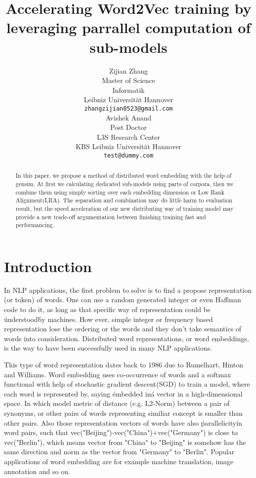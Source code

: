 \documentclass[11pt]{article}
\title{Accelerating Word2Vec training by leveraging parrallel computation of sub-models}
\author{Zijian Zhang \\
	Master of Science\\
	Informatik\\
	Leibniz Universit{\"a}t Hannover\\
	{\tt zhangzijian0523@gmail.com}\\ \And
	Avishek Anand\\
	Post Doctor\\
	L3S Research Center\\
	KBS Leibniz Universit{\"a}t Hannover\\
	{\tt test@dummy.com}\\
  }
\date{}
\begin{document}
\maketitle

\begin{abstract}

    In this paper, we propose a method of distributed word embedding with the help of gensim. At first we calculating dedicated sub-models using parts of corpora, then we combine them using simply sorting over each embedding dimension or Low Rank Alignment(LRA). The separation and combination may do little harm to evaluation result, but the speed acceleration of our new distributing way of training model may provide a new trade-off argumentation between finishing training fast and performancing.
 
\end{abstract}


\section{Introduction}
In NLP applications, the first problem to solve is to find a propose representation (or token) of words\cite{schutze2008introduction}. One can use a random generated integer or even Haffman code\cite{elcompression} to do it, as long as that specific way of representation could be \'understood\' by machines. How ever, simple integer or frequency based representation lose the ordering or the words and they don't take semantics of words into consideration\cite{le2014distributed}. Distributed word representations, or word embeddings, is the way to have been successfully used in many NLP applications. 

This type of word representation dates back to 1986 due to Rumelhart, Hinton and Williams\cite{williams1986learning}. Word embedding uses co-occurrence of words and a softmax functional with help of stochastic gradient descent(SGD) to train a model, where each word is represented by, saying \'embedded in\' a vector in a high-dimensional space. In which model metric of distance (e.g. L2-Norm) between a pair of synonyms, or other pairs of words representing similiar concept is smaller than other pairs. Also those representation vectors of words have also \'parallelicity\' in word pairs, such that vec("Beijing")-vec("China")+vec("Germany") is close to vec("Berlin")\cite{le2014distributed}, which means vector from "China" to "Beijing" is somehow has the same direction and norm as the vector from "Germany" to "Berlin". Popular applications of word embedding are for example machine translation\cite{cho2014learning}, image annotation\cite{weston2011wsabie} and so on. 
\end{document}
